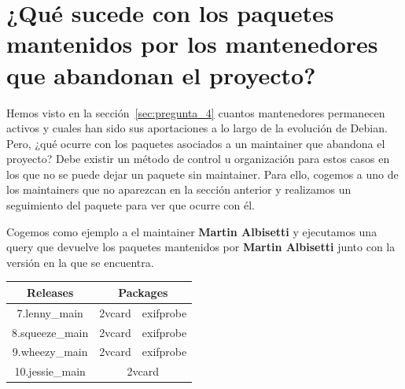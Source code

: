\documentclass[a4paper, 12pt]{book}
\begin{document}
\section{¿Qué sucede con los paquetes mantenidos por los mantenedores que abandonan el proyecto?}
\label{sec:pregunta_5}
Hemos visto en la sección~\ref{sec:pregunta_4} cuantos mantenedores permanecen activos y cuales han sido sus aportaciones a lo largo de la evolución de Debian. 
Pero, ¿qué ocurre con los paquetes asociados a un maintainer que abandona el proyecto?
Debe existir un método de control u organización para estos casos en los que no se puede dejar un paquete sin maintainer.
Para ello, cogemos a uno de los maintainers que no aparezcan en la sección anterior y realizamos un seguimiento del paquete para ver que ocurre con él.

Cogemos como ejemplo a el maintainer \textbf{Martin Albisetti} y ejecutamos una query que devuelve los paquetes mantenidos por \textbf{Martin Albisetti} junto con la versión en la que se encuentra.

\begin{table}[h]
	\begin{tabular}{|c|cc|}
		\hline
		\rowcolor[HTML]{FFFE65} 
		Releases        & \multicolumn{2}{c|}{\cellcolor[HTML]{FFFE65}Packages} \\ \hline
		7.lenny\_main   & \multicolumn{1}{c|}{2vcard}        & exifprobe        \\ \hline
		8.squeeze\_main & \multicolumn{1}{c|}{2vcard}        & exifprobe        \\ \hline
		9.wheezy\_main  & \multicolumn{1}{c|}{2vcard}        & exifprobe        \\ \hline
		10.jessie\_main & \multicolumn{2}{c|}{2vcard}                           \\ \hline
	\end{tabular}
\end{table}
\end{document}
